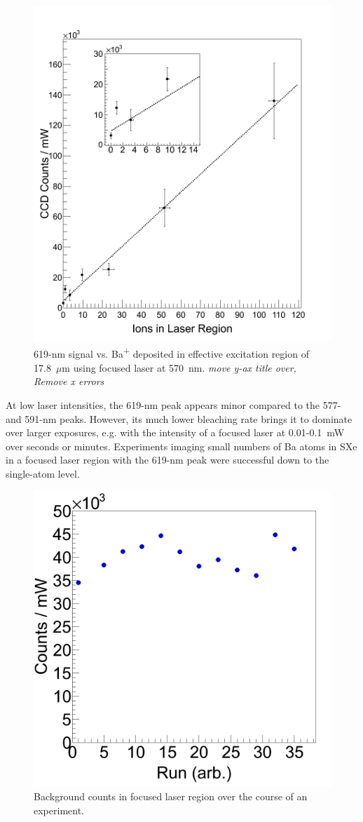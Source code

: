 \begin{figure} %
        \centering
                \includegraphics[width=.99\textwidth]{figures/fitgrouped_20150807_20150916_inset.png}
                \caption{619-nm signal vs. Ba\textsuperscript{+} deposited in effective excitation region of 17.8~$\mu$m using focused laser at 570~nm. \emph{\color{red}move y-ax title over, Remove x errors}}
\label{fig:lin}
\end{figure}

At low laser intensities, the 619-nm peak appears minor compared to the 577- and 591-nm peaks.  However, its much lower bleaching rate brings it to dominate over larger exposures, e.g. with the intensity of a focused laser at 0.01-0.1~mW over seconds or minutes.  Experiments imaging small numbers of Ba atoms in SXe in a focused laser region with the 619-nm peak were successful down to the single-atom level.

\begin{figure} %
        \centering
                \includegraphics[width=.4\textwidth]{figures/xe_variation.png}
                \caption{Background counts in focused laser region over the course of an experiment.}
\label{fig:xevar}
\end{figure}

